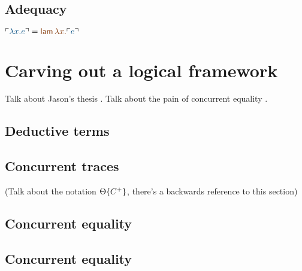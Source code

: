 \subsection{Adequacy}

$\interp{\obj{\lambda x.e}} = \lf{{\sf lam}\,\lambda x. \interp{\obj{e}}}$

\section{Carving out a logical framework}


Talk about Jason's thesis \cite{}. Talk about the pain of concurrent 
equality \cite{}.

\subsection{Deductive terms}

\subsection{Concurrent traces}
\label{sec:framework-substprop}


(Talk about the notation ${\Theta}\{{C^+}\}$, there's a backwards
reference to this section)

\subsection{Concurrent equality}

\subsection{Concurrent equality}
\label{sec:linconcurrenteq}

